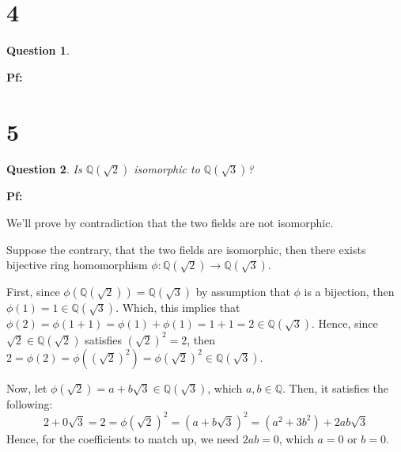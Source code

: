 \documentclass{article}
\newtheorem{question}{Question}
\begin{document}
\break

\section*{4}
\begin{myBox}[]{}
    \begin{question}
        
    \end{question}
\end{myBox}

\textbf{Pf:}

\break

\section*{5}
\begin{myBox}[]{}
    \begin{question}
        Is $\mathbb{Q}(\sqrt{2})$ isomorphic to $\mathbb{Q}(\sqrt{3})$?
    \end{question}
\end{myBox}

\textbf{Pf:}

We'll prove by contradiction that the two fields are not isomorphic.

Suppose the contrary, that the two fields are isomorphic, then there exists bijective ring homomorphism $\phi:\mathbb{Q}(\sqrt{2})\rightarrow\mathbb{Q}(\sqrt{3})$.

First, since $\phi(\mathbb{Q}(\sqrt{2}))= \mathbb{Q}(\sqrt{3})$ by assumption that $\phi$ is a bijection, then $\phi(1)=1\in\mathbb{Q}(\sqrt{3})$.
Which, this implies that $\phi(2)=\phi(1+1)=\phi(1)+\phi(1)=1+1=2\in\mathbb{Q}(\sqrt{3})$. Hence, since $\sqrt{2}\in\mathbb{Q}(\sqrt{2})$ satisfies $(\sqrt{2})^2=2$,
then $2=\phi(2)=\phi((\sqrt{2})^2)=\phi(\sqrt{2})^2\in\mathbb{Q}(\sqrt{3})$.

Now, let $\phi(\sqrt{2})=a+b\sqrt{3}\in\mathbb{Q}(\sqrt{3})$, which $a,b\in\mathbb{Q}$. Then, it satisfies the following:
$$2+0\sqrt{3}=2=\phi(\sqrt{2})^2=(a+b\sqrt{3})^2=(a^2+3b^2)+2ab\sqrt{3}$$
Hence, for the coefficients to match up, we need $2ab = 0$, which $a=0$ or $b=0$.
\end{document}
